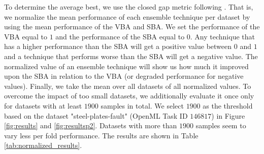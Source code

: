 \documentclass[11pt]{article}
\begin{document}
To determine the average best, we use the closed gap metric following \cite{DBLP:conf/oasc/LindauerRK17}. 
That is, we normalize the mean performance of each ensemble technique per dataset by using the mean performance of the VBA and SBA. 
We set the performance of the VBA equal to $1$ and the performance of the SBA equal to $0$. Any technique that has a higher performance than the SBA will get a positive value between $0$ and $1$ and a technique that performs worse than the SBA will get a negative value. The normalized value of an ensemble technique will show us how much it improved upon the SBA in relation to the VBA (or degraded performance for negative values). 
Finally, we take the mean over all datasets of all normalized values.
To overcome the impact of too small datasets, we additionally evaluate it once only for datasets with at least $1900$ samples in total. We select $1900$ as the threshold based on the dataset "steel-plates-fault" (OpenML Task ID $146817$) in Figure \ref{fig:results} and \ref{fig:resultsp2}. Datasets with more than $1900$ samples seem to vary less per fold performance. 
The results are shown in Table \ref{tab:normalized_results}. 

\begin{table}[h]
    \centering
    \caption{\textbf{Ensemble Technique Results} Shown are the mean and standard deviation in parentheses of the closed gap normalized performances for each ensemble technique on all datasets and only on datasets with at least $1900$ samples.
    The evaluated ensemble techniques are Dynamic Classifier Selection (DCS), Dynamic Ensemble Selection (DES), Stacking, Voting, Ensemble Selection (ES), Virtual Best Ensemble (VBE), and Virtual Best Algorithm (VBA). 
    }
    \label{tab:normalized_results}
\end{table}
\end{document}
